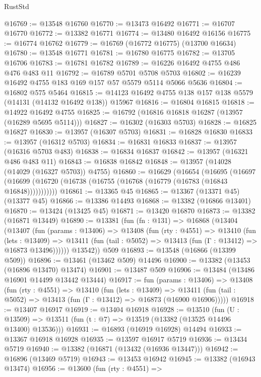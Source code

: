 \begin{lexlean}{RustStd}
\begin{coremodule}
@16769 := @13548 @16760
@16770 := @13473 @16492
@16771 := @16707 @16770
@16772 := @13382 @16771
@16774 := @13480 @16492 @16156
@16775 := @16774 @16762
@16779 := @16769 (@16772 @16775) (@13700 @16634)
@16780 := @13548 @16771
@16781 := @16780 @16775
@16782 := @13705 @16706
@16783 := @16781 @16782
@16789 := @16226 @16492 @4755 @486 @476 @483 @11
@16792 := @16789 @5701 @5708 @5703
@16802 := @16239 @16492 @4755 @183 @169 @157 @57 @5579 @5114 @5066 @5636
@16804 := @16802 @575 @5464
@16815 := @14123 @16492 @4755 @138 @157 @138 @5579 (@14131 (@14132 @16492 @138)) @15967
@16816 := @16804 @16815
@16818 := @14922 @16492 @4755
@16825 := @16792 (@16816 @16818 @16287 (@13957 (@16289 @5695 @5114)))
@16827 := @16302 (@16303 @5703)
@16828 := @16825 @16827
@16830 := @13957 (@16307 @5703)
@16831 := @16828 @16830
@16833 := @13957 (@16312 @5703)
@16834 := @16831 @16833
@16837 := @13957 (@16316 @5703 @483)
@16838 := @16834 @16837
@16842 := @13957 (@16321 @486 @483 @11)
@16843 := @16838 @16842
@16848 := @13957 (@14028 (@14029 (@16327 @5703)) @4755)
@16860 := @16629
    (@16654
      (@16695
        (@16697 (@16699 (@16720 (@16738 (@16755 (@16768 (@16779 (@16783 (@16843 @16848)))))))))))
@16861 := @13365 @45
@16865 := @13367 (@13371 @45) (@13377 @45)
@16866 := @13386 @14493
@16868 := @13382 (@16866 @13401)
@16870 := @13424 (@13425 @45)
@16871 := @13420 @16870
@16873 := @13382 (@16871 @13449)
@16890 := @13381
    (fun (fn : @131) =>
    @16868
      (@13404
        (@13407
          (fun (params : @13406) =>
          @13408
            (fun (rty : @4551) =>
            @13410
              (fun (lets : @13409) =>
              @13411 (fun (tail : @5052) => @13413 (fun (Γ : @13412) => @16873 @13496))))))
        @13542))
    @509
@16893 := @13548 (@16866 (@13399 @509))
@16896 := @13461 (@13462 @509) @14496
@16900 := @13382 (@13453 (@16896 @13470) @13474)
@16901 := @13487 @509
@16906 := @13484 (@13486 @16901 @14499 @13442 @13444)
@16917 := fun (params : @13406) =>
  @13408
    (fun (rty : @4551) =>
    @13410
      (fun (lets : @13409) =>
      @13411 (fun (tail : @5052) => @13413 (fun (Γ : @13412) => @16873 (@16900 @16906)))))
@16918 := @13407 @16917
@16919 := @13404 @16918
@16928 := @13510
    (fun (U : @13509) => @13511 (fun (t : @7) => @13519 (@13382 (@13525 @14496 @13400) @13536)))
@16931 := @16893 (@16919 @16928) @14494
@16933 := @13367 @16918 @16928
@16935 := @13597 @16917 @5719
@16936 := @13434 @5719
@16940 := @13382 (@16871 (@13432 (@16936 @13447)))
@16942 := @16896 (@13469 @5719)
@16943 := @13453 @16942
@16945 := @13382 (@16943 @13474)
@16956 := @13600
    (fun (rty : @4551) =>

\end{coremodule}
\end{lexlean}
